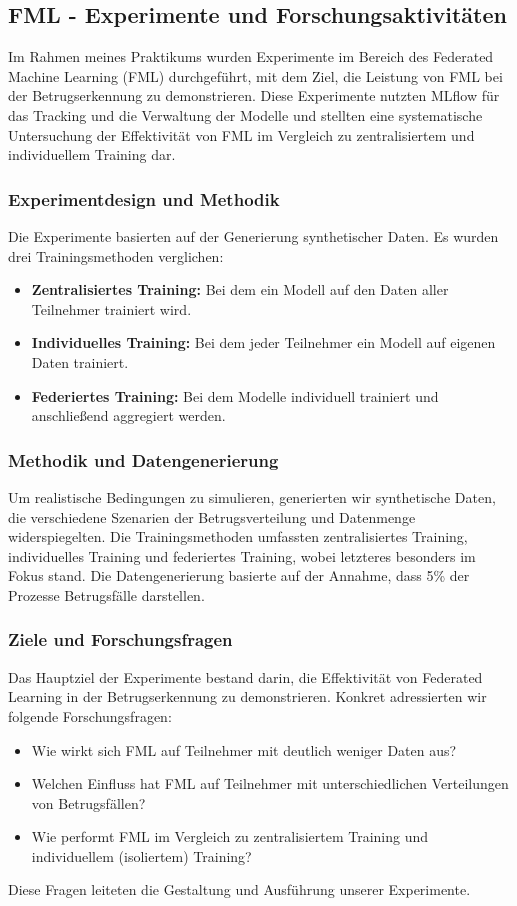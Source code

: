 \documentclass[11pt]{article}
\begin{document}
\subsection{FML - Experimente und Forschungsaktivitäten}
Im Rahmen meines Praktikums wurden Experimente im Bereich des Federated Machine Learning (FML) durchgeführt, mit dem Ziel, die Leistung von FML bei der Betrugserkennung zu demonstrieren. Diese Experimente nutzten MLflow für das Tracking und die Verwaltung der Modelle und stellten eine systematische Untersuchung der Effektivität von FML im Vergleich zu zentralisiertem und individuellem Training dar.

\subsubsection{Experimentdesign und Methodik}
Die Experimente basierten auf der Generierung synthetischer Daten. Es wurden drei Trainingsmethoden verglichen: 
\begin{itemize}
    \item \textbf{Zentralisiertes Training:} Bei dem ein Modell auf den Daten aller Teilnehmer trainiert wird.
    \item \textbf{Individuelles Training:} Bei dem jeder Teilnehmer ein Modell auf eigenen Daten trainiert.
    \item \textbf{Federiertes Training:} Bei dem Modelle individuell trainiert und anschließend aggregiert werden. 
\end{itemize}

\subsubsection{Methodik und Datengenerierung}
Um realistische Bedingungen zu simulieren, generierten wir synthetische Daten, die verschiedene Szenarien der Betrugsverteilung und Datenmenge widerspiegelten. Die Trainingsmethoden umfassten zentralisiertes Training, individuelles Training und federiertes Training, wobei letzteres besonders im Fokus stand. Die Datengenerierung basierte auf der Annahme, dass 5\% der Prozesse Betrugsfälle darstellen.

\subsubsection{Ziele und Forschungsfragen}

Das Hauptziel der Experimente bestand darin, die Effektivität von Federated Learning in der Betrugserkennung zu demonstrieren. Konkret adressierten wir folgende Forschungsfragen:
\begin{itemize}
    \item Wie wirkt sich FML auf Teilnehmer mit deutlich weniger Daten aus?
    \item Welchen Einfluss hat FML auf Teilnehmer mit unterschiedlichen Verteilungen von Betrugsfällen?
    \item Wie performt FML im Vergleich zu zentralisiertem Training und individuellem (isoliertem) Training?
\end{itemize}
\newline
Diese Fragen leiteten die Gestaltung und Ausführung unserer Experimente.
\end{document}
